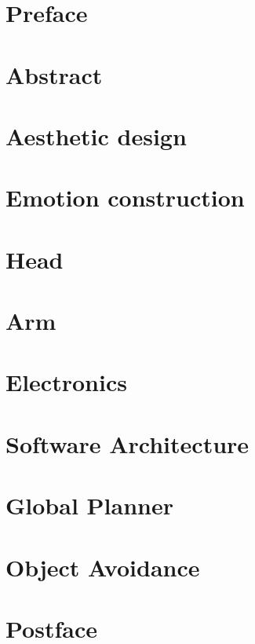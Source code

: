 \documentclass[a4paper,10pt,titlepage]{report}
\begin{document}

\newpage


\newpage
{}

\newcommand{\todo}[1]{\textbf{\textsc{\textcolor{red}{[#1]}}}}

\chapter{Preface}

\label{preface}

\chapter{Abstract}

\label{abstract}
\newpage

\tableofcontents

\chapter{Aesthetic design}

\label{aesthetic_design}

\chapter{Emotion construction}

\label{emotions}

\chapter{Head}

\label{head}

\chapter{Arm}

\label{arm}

\chapter{Electronics}

\label{electronics}

\chapter{Software Architecture}

\label{Software Architecture}

\chapter{Global Planner}

\label{global_planner}

\chapter{Object Avoidance}

\label{object_avoidance}

\chapter{Postface}

\label{postface}
\end{document}

